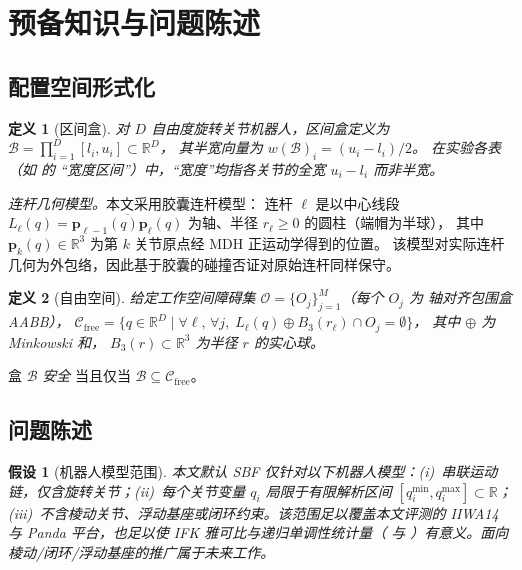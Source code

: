 \documentclass[journal]{IEEEtran}
\newtheorem{definition}{定义}
\newtheorem{assumption}{假设}
\newcommand{\Real}{\mathbb{R}}
\newcommand{\Cfree}{\mathcal{C}_{\mathrm{free}}}
\newcommand{\calO}{\mathcal{O}}
\begin{document}
\section{预备知识与问题陈述}\label{sec:prelim}

\subsection{配置空间形式化}

\begin{definition}[区间盒]
对 $D$ 自由度旋转关节机器人，\emph{区间盒}定义为
$\mathcal{B} = \prod_{i=1}^{D}[l_i, u_i] \subset \Real^D$，
其半宽向量为 $w(\mathcal{B})_i = (u_i-l_i)/2$。
在实验各表（如  的
``宽度区间''）中，``宽度''均指各关节的全宽 $u_i-l_i$ 而非半宽。
\end{definition}

\emph{连杆几何模型。}本文采用胶囊连杆模型：
连杆 $\ell$ 是以中心线段
$L_\ell(q)=\overline{\bm{p}_{\ell-1}(q)\bm{p}_\ell(q)}$
为轴、半径 $r_\ell\geq 0$ 的圆柱（端帽为半球），
其中 $\bm{p}_k(q)\in\Real^3$ 为第 $k$ 关节原点经 MDH 正运动学得到的位置。
该模型对实际连杆几何为外包络，因此基于胶囊的碰撞否证对原始连杆同样保守。

\begin{definition}[自由空间]\label{def:cfree}
给定工作空间障碍集 $\calO = \{O_j\}_{j=1}^{M}$（每个 $O_j$ 为
轴对齐包围盒 AABB），
$\Cfree = \{q \in \Real^D \mid \forall \ell,\,\forall j,\;
L_\ell(q) \oplus B_3(r_\ell) \cap O_j = \emptyset\}$，
其中 $\oplus$ 为 Minkowski 和，
$B_3(r)\subset\Real^3$ 为半径 $r$ 的实心球。
\end{definition}

盒 $\mathcal{B}$ \emph{安全} 当且仅当 $\mathcal{B} \subseteq \Cfree$。

\subsection{问题陈述}\label{sec:problem}

\begin{assumption}[机器人模型范围]\label{ass:robot_scope}
本文默认 SBF 仅针对以下机器人模型：(i)~串联运动链，仅含旋转关节；(ii)~每个关节变量 $q_i$ 局限于有限解析区间 $[q_i^{\min},q_i^{\max}]\subset\Real$；(iii)~不含棱动关节、浮动基座或闭环约束。该范围足以覆盖本文评测的 IIWA14 与 Panda 平台，也足以使 IFK 雅可比与递归单调性统计量（ 与 ）有意义。面向棱动/闭环/浮动基座的推广属于未来工作。
\end{assumption}
\end{document}
